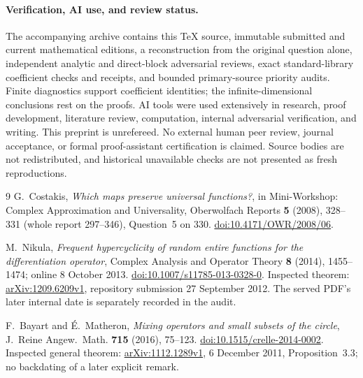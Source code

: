 \documentclass[11pt]{article}
\begin{document}
\clearpage
\paragraph{Verification, AI use, and review status.}
The accompanying archive contains this TeX source, immutable submitted and
current mathematical editions, a reconstruction from the original question
alone, independent analytic and direct-block adversarial reviews, exact
standard-library coefficient checks and receipts, and bounded primary-source
priority audits. Finite diagnostics support coefficient identities; the
infinite-dimensional conclusions rest on the proofs.
AI tools were used extensively in research, proof development, literature
review, computation, internal adversarial verification, and writing.
This preprint is unrefereed. No external human peer review, journal acceptance,
or formal proof-assistant certification is claimed. Source bodies are not
redistributed, and historical unavailable checks are not presented as fresh
reproductions.

\begin{thebibliography}{9}
G.~Costakis, \emph{Which maps preserve universal functions?},
in Mini-Workshop: Complex Approximation and Universality,
Oberwolfach Reports \textbf{5} (2008), 328--331
(whole report 297--346), Question~5 on 330.
\href{https://doi.org/10.4171/OWR/2008/06}{doi:10.4171/OWR/2008/06}.

M.~Nikula, \emph{Frequent hypercyclicity of random entire functions for the
differentiation operator}, Complex Analysis and Operator Theory \textbf{8}
(2014), 1455--1474; online 8 October 2013.
\href{https://doi.org/10.1007/s11785-013-0328-0}{doi:10.1007/s11785-013-0328-0}.
Inspected theorem: \href{https://arxiv.org/abs/1209.6209v1}{arXiv:1209.6209v1},
repository submission 27 September 2012.
The served PDF's later internal date is separately recorded in the audit.

F.~Bayart and \'E.~Matheron, \emph{Mixing operators and small subsets of the
circle}, J.~Reine Angew.~Math. \textbf{715} (2016), 75--123.
\href{https://doi.org/10.1515/crelle-2014-0002}{doi:10.1515/crelle-2014-0002}.
Inspected general theorem:
\href{https://arxiv.org/abs/1112.1289v1}{arXiv:1112.1289v1},
6 December 2011, Proposition~3.3; no backdating of a later explicit remark.
\end{thebibliography}
\end{document}
